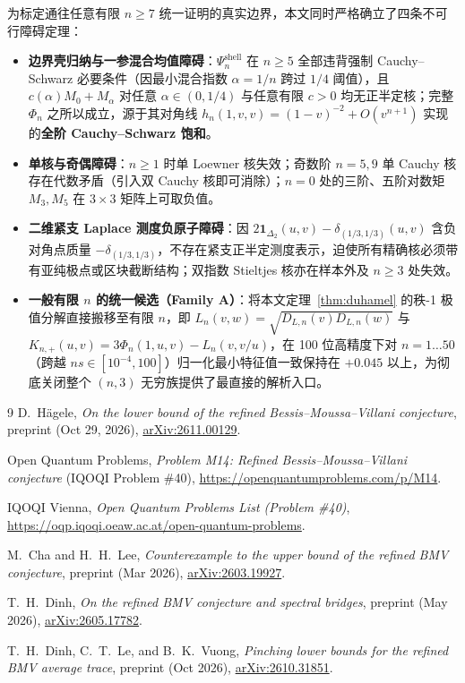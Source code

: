 \documentclass[11pt,a4paper]{article}
\theoremstyle{remark}
\begin{document}
为标定通往任意有限 $n \ge 7$ 统一证明的真实边界，本文同时严格确立了四条不可行障碍定理：
\begin{itemize}
  \item \textbf{边界壳归纳与一参混合均值障碍}：$\Psi_n^{\mathrm{shell}}$ 在 $n\ge 5$ 全部违背强制 Cauchy--Schwarz 必要条件（因最小混合指数 $\alpha = 1/n$ 跨过 $1/4$ 阈值），且 $c(\alpha)M_0 + M_\alpha$ 对任意 $\alpha\in(0,1/4)$ 与任意有限 $c>0$ 均无正半定核；完整 $\Phi_n$ 之所以成立，源于其对角线 $h_n(1,v,v) = (1-v)^{-2}+O(v^{n+1})$ 实现的\textbf{全阶 Cauchy--Schwarz 饱和}。
  \item \textbf{单核与奇偶障碍}：$n\ge 1$ 时单 Loewner 核失效；奇数阶 $n=5,9$ 单 Cauchy 核存在代数矛盾（引入双 Cauchy 核即可消除）；$n=0$ 处的三阶、五阶对数矩 $M_3, M_5$ 在 $3\times 3$ 矩阵上可取负值。
  \item \textbf{二维紧支 Laplace 测度负原子障碍}：因 $2\mathbf{1}_{\Delta_2}(u,v)-\delta_{(1/3,1/3)}(u,v)$ 含负对角点质量 $-\delta_{(1/3,1/3)}$，不存在紧支正半定测度表示，迫使所有精确核必须带有亚纯极点或区块截断结构；双指数 Stieltjes 核亦在样本外及 $n\ge 3$ 处失效。
  \item \textbf{一般有限 $n$ 的统一候选（Family A）}：将本文定理~\ref{thm:duhamel} 的秩-1 极值分解直接搬移至有限 $n$，即 $L_n(v,w) = \sqrt{D_{L,n}(v)D_{L,n}(w)}$ 与 $K_{n,+}(u,v) = 3\Phi_n(1,u,v) - L_n(v, v/u)$，在 100 位高精度下对 $n=1\dots 50$（跨越 $ns\in[10^{-4}, 100]$）归一化最小特征值一致保持在 $+0.045$ 以上，为彻底关闭整个 $(n,3)$ 无穷族提供了最直接的解析入口。
\end{itemize}

\begin{thebibliography}{9}
D.~H\"agele, \emph{On the lower bound of the refined Bessis--Moussa--Villani conjecture}, preprint (Oct 29, 2026), \href{https://arxiv.org/html/2611.00129v1}{arXiv:2611.00129}.

Open Quantum Problems, \emph{Problem M14: Refined Bessis--Moussa--Villani conjecture} (IQOQI Problem \#40), \url{https://openquantumproblems.com/p/M14}.

IQOQI Vienna, \emph{Open Quantum Problems List (Problem \#40)}, \url{https://oqp.iqoqi.oeaw.ac.at/open-quantum-problems}.

M.~Cha and H.~H.~Lee, \emph{Counterexample to the upper bound of the refined BMV conjecture}, preprint (Mar 2026), \href{https://arxiv.org/abs/2603.19927}{arXiv:2603.19927}.

T.~H.~Dinh, \emph{On the refined BMV conjecture and spectral bridges}, preprint (May 2026), \href{https://arxiv.org/html/2605.17782v1}{arXiv:2605.17782}.

T.~H.~Dinh, C.~T.~Le, and B.~K.~Vuong, \emph{Pinching lower bounds for the refined BMV average trace}, preprint (Oct 2026), \href{https://arxiv.org/html/2610.31851v1}{arXiv:2610.31851}.
\end{thebibliography}
\end{document}
